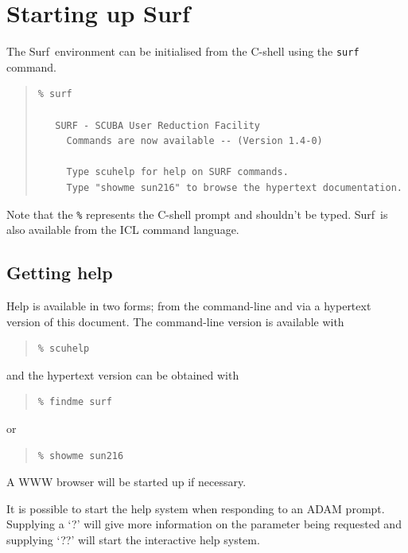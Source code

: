 \documentclass[twoside,11pt]{article}
\newcommand{\scusoft}          {{\sc Surf}}
\newenvironment{myquote}{\begin{quote}\begin{small}}{\end{small}\end{quote}}
\newcommand{\xlabel}[1]{}
\renewcommand{\_}{\texttt{\symbol{95}}}
\begin{document}
\section{\xlabel{startup}Starting up \scusoft \label{startup}}

The \scusoft\ environment can be initialised from the C-shell using the
\texttt{surf} command.

\begin{myquote}
\begin{verbatim}
% surf
 
   SURF - SCUBA User Reduction Facility
     Commands are now available -- (Version 1.4-0)
 
     Type scuhelp for help on SURF commands.
     Type "showme sun216" to browse the hypertext documentation.

\end{verbatim}
\end{myquote}

Note that the \texttt{\%} represents the C-shell prompt and shouldn't be typed.
\scusoft\ is also available from the ICL command language.


\subsection{Getting help}

Help is available in two forms; from the command-line and via a hypertext 
version of this document. The command-line version is available with

\begin{myquote}
\begin{verbatim}
% scuhelp
\end{verbatim}
\end{myquote}

and the hypertext version can be obtained with

\begin{myquote}
\begin{verbatim}
% findme surf
\end{verbatim}
\end{myquote}
or
\begin{myquote}
\begin{verbatim}
% showme sun216
\end{verbatim}
\end{myquote}
A WWW browser will be started up if necessary.

It is possible to start the help system when responding to
an ADAM prompt. Supplying a `?' will give more information on the
parameter being requested and supplying `??' will start the interactive
help system.
\end{document}
